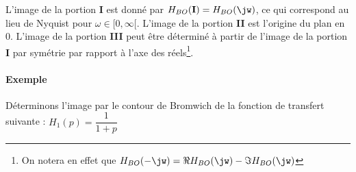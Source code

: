 L'image de la portion \textbf{I} est donné par $H_{BO}(\boldsymbol{\mathrm{I}})=H_{BO}(\jw)$, 
ce qui correspond au lieu de Nyquist pour $\omega\in[0,\infty[$. 
L'image de la portion \textbf{II} est l'origine du plan en 0. L'image de la 
portion \textbf{III} peut être déterminé à partir de l'image de la 
portion \textbf{I} par symétrie par rapport à l'axe des réels\footnote{On notera 
en effet que $H_{BO}(-\jw)=\Re{H_{BO}(\jw)}-\Im{H_{BO}(\jw)}$}.

\paragraph{Exemple}

Déterminons l'image par le contour de Bromwich de la fonction de transfert suivante :
$H_1(p)=\dfrac{1}{1+p}$


